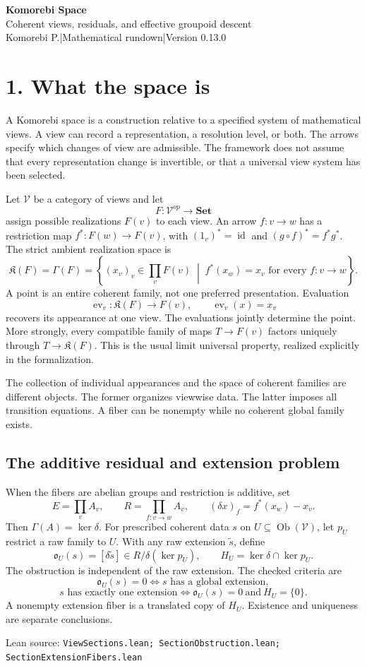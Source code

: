 \documentclass[11pt]{article}
\newcommand{\V}{\mathcal V}
\newcommand{\K}{\mathfrak K}
\newcommand{\ev}{\operatorname{ev}}
\newcommand{\id}{\operatorname{id}}
\newcommand{\source}[1]{\par{\footnotesize\textsf{Lean source:} \texttt{#1}}\par}
\begin{document}
\thispagestyle{plain}
{\Large\color{ink}\textbf{Komorebi Space}}\\[4pt]
{\large Coherent views, residuals, and effective groupoid descent}\\[7pt]
{\small Komorebi P.\quad |\quad Mathematical rundown\quad |\quad Version 0.13.0}
\vspace{10pt}

\section*{1. What the space is}
A Komorebi space is a construction relative to a specified system of mathematical views. A view can record a representation, a resolution level, or both. The arrows specify which changes of view are admissible. The framework does not assume that every representation change is invertible, or that a universal view system has been selected.

Let $\V$ be a category of views and let
\[
F:\V^{op}\longrightarrow\mathbf{Set}
\]
assign possible realizations $F(v)$ to each view. An arrow $f:v\to w$ has a restriction map $f^*:F(w)\to F(v)$, with $(1_v)^*=\id$ and $(g\circ f)^*=f^*g^*$. The strict ambient realization space is
\[
\boxed{\K(F)=\Gamma(F)=
\left\{(x_v)_v\in\prod_v F(v)\;\middle|\;
 f^*(x_w)=x_v\text{ for every }f:v\to w\right\}.}
\]
A point is an entire coherent family, not one preferred presentation. Evaluation
\[
\ev_v:\K(F)\to F(v),\qquad\ev_v(x)=x_v
\]
recovers its appearance at one view. The evaluations jointly determine the point. More strongly, every compatible family of maps $T\to F(v)$ factors uniquely through $T\to\K(F)$. This is the usual limit universal property, realized explicitly in the formalization.

The collection of individual appearances and the space of coherent families are different objects. The former organizes viewwise data. The latter imposes all transition equations. A fiber can be nonempty while no coherent global family exists.

\subsection*{The additive residual and extension problem}
When the fibers are abelian groups and restriction is additive, set
\[
E=\prod_v A_v,\qquad R=\prod_{f:v\to w}A_v,\qquad
(\delta x)_f=f^*(x_w)-x_v.
\]
Then $\Gamma(A)=\ker\delta$. For prescribed coherent data $s$ on $U\subseteq\operatorname{Ob}(\V)$, let $p_U$ restrict a raw family to $U$. With any raw extension $\widetilde s$, define
\[
\mathfrak o_U(s)=[\delta\widetilde s]\in R/\delta(\ker p_U),
\qquad H_U=\ker\delta\cap\ker p_U.
\]
The obstruction is independent of the raw extension. The checked criteria are
\[
\mathfrak o_U(s)=0\iff s\text{ has a global extension},
\]
\[
s\text{ has exactly one extension}\iff
\mathfrak o_U(s)=0\ \text{and}\ H_U=\{0\}.
\]
A nonempty extension fiber is a translated copy of $H_U$. Existence and uniqueness are separate conclusions.
\source{ViewSections.lean; SectionObstruction.lean; SectionExtensionFibers.lean}
\end{document}
